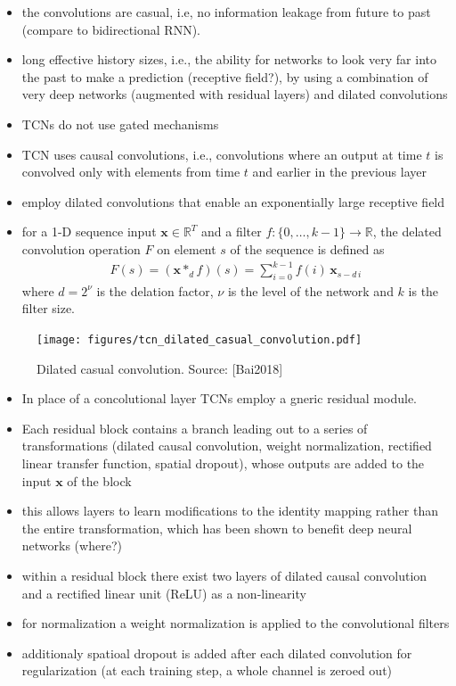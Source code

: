 \documentclass{article}
\begin{document}
\begin{itemize}
\item the convolutions are casual, i.e, no information leakage from future to past (compare to bidirectional RNN).
\item long effective history sizes, i.e., the ability for networks to look very far into the past to make a prediction (receptive field?), by using a combination of very deep networks (augmented with residual layers) and dilated convolutions 
\item TCNs do not use gated mechanisms 
\item TCN uses causal convolutions, i.e., convolutions where an output at time $t$ is convolved only with elements from time $t$ and earlier in the previous layer 
\item employ dilated convolutions that enable an exponentially large receptive field
\item for a 1-D sequence input $\mathbf x \in \mathbb R^T$ and a filter $f:\{ 0, \dots, k-1\} \rightarrow \mathbb R$, the delated convolution operation $F$ on element $s$ of the sequence is defined as
\begin{align}
F(s) = (\mathbf x *_d f)(s) = \sum_{i=0}^{k-1} f(i) \, \mathbf x_{s-d\,i}
\end{align}
where $d = 2^\nu$ is the delation factor, $\nu$ is the level of the network and $k$ is the filter size.  
\end{itemize}
\begin{figure}[htbp]
	\centering
	\texttt{[image: figures/tcn\_dilated\_casual\_convolution.pdf]}
	\caption{Dilated casual convolution. Source: \cite{Bai2018}[Bai2018]}
	\label{fig:figure1}	
\end{figure}

\begin{itemize}
\item In place of a concolutional layer TCNs employ a gneric residual module. 
\item Each residual block contains a branch leading out to a series of transformations (dilated causal convolution, weight normalization, rectified linear transfer function, spatial dropout), whose outputs are added to the input $\mathbf x$ of the block
\item this allows layers to learn modifications to the identity mapping rather than the entire transformation, which has been shown to benefit deep neural networks (where?)
\item within a residual block there exist two layers of dilated causal convolution and a rectified linear unit (ReLU) \cite[Nair2010]{Nair2010} as a non-linearity
\item for normalization a weight normalization \cite[Salimans2016]{Salimans2016} is applied to the convolutional filters 
\item additionaly spatioal dropout \cite[Srivastava2014]{Srivastava2014} is added after each dilated convolution for regularization (at each training step, a whole channel is zeroed out)
\end{itemize}
\end{document}
